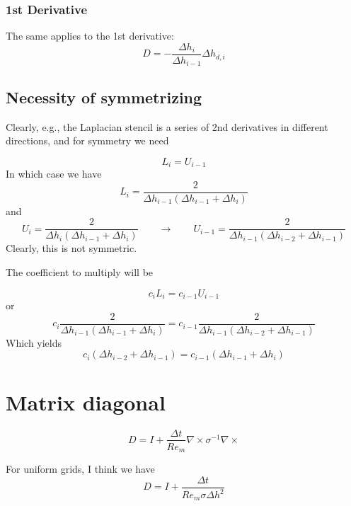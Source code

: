 \documentclass[landscape]{article}
\begin{document}
\subsubsection{1st Derivative}
The same applies to the 1st derivative:
\begin{equation}
   D = - \frac{\Delta h_{i}}{\Delta h_{i-1}} \Delta h_{d,i}
\end{equation}


\subsection{Necessity of symmetrizing}

Clearly, e.g., the Laplacian stencil is a series of 2nd derivatives in different directions, and for symmetry we need

\begin{equation}
  L_{i} = U_{i-1}
\end{equation}
In which case we have
\begin{equation}
  L_{i} = \frac{2}{\Delta h_{{i-1}} \left(\Delta h_{{i-1}} + \Delta h_{{i}}\right)}
\end{equation}
and
\begin{equation}
  U_{i} = \frac{2}{\Delta h_{{i}} \left(\Delta h_{{i-1}} + \Delta h_{{i}}\right)}
  \qquad \rightarrow
  \qquad
  U_{i-1} = \frac{2}{\Delta h_{{i-1}} \left(\Delta h_{{i-2}} + \Delta h_{{i-1}}\right)}
\end{equation}
Clearly, this is not symmetric.

The coefficient to multiply will be

\begin{equation}
  c_i L_{i} = c_{i-1} U_{i-1}
\end{equation}
or
\begin{equation}
  c_i \frac{2}{\Delta h_{{i-1}} \left(\Delta h_{{i-1}} + \Delta h_{{i}}\right)} =
  c_{i-1} \frac{2}{\Delta h_{{i-1}} \left(\Delta h_{{i-2}} + \Delta h_{{i-1}}\right)}
\end{equation}
Which yields
\begin{equation}
  c_i (\Delta h_{{i-2}} + \Delta h_{{i-1}}) =
  c_{i-1} (\Delta h_{{i-1}} + \Delta h_{{i}})
\end{equation}

\section{Matrix diagonal}
\begin{equation}
  D = I + \frac{\Delta t}{Re_m} \nabla \times \sigma^{-1} \nabla \times
\end{equation}

For uniform grids, I think we have
\begin{equation}
  D = I + \frac{\Delta t}{Re_m \sigma \Delta h^2}
\end{equation}
\end{document}
